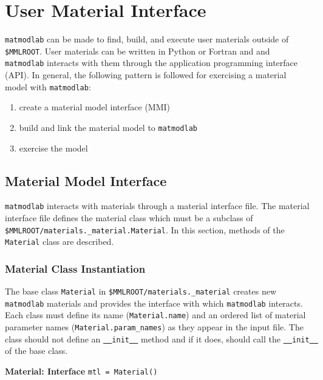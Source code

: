 \documentclass[12pt,report,strict]{SANDreport/SANDreport}
\newenvironment{interface}%
   {\par\noindent\adjustbox{margin=1ex,bgcolor=lemon,margin=0ex
       \medskipamount}\bgroup\minipage\textwidth}%
   {\endminipage\egroup}
\newcommand{\usage}[1]{\indent\hspace{2.5em}\texttt{#1}}
\newcommand{\mml}{\texttt{matmodlab}}
\newcommand{\us}{\underline{  }}
\newcommand{\uus}{\us\us{}}
\begin{document}
\chapter{User Material Interface}
\label{chap:usrmtl}
\mml{} can be made to find, build, and execute user materials outside of
\verb|$MMLROOT|.  User materials can be written in Python or Fortran and and
\mml{} interacts with them through the application programming interface
(API).  In general, the following pattern is followed for exercising a
material model with \mml{}:
%
\begin{enumerate}
  \item create a material model interface (MMI)
  \item build and link the material model to \mml{}
  \item exercise the model
\end{enumerate}
%

\section{Material Model Interface}
\label{sec:usrint}
\mml{} interacts with materials through a material interface file. The
material interface file defines the material class which must be a subclass of\\
\verb|$MMLROOT/materials._material.Material|.  In this section, methods of the
\verb|Material| class are described.

\subsection{Material Class Instantiation}
\label{sec:basecls}
The base class \verb|Material| in \verb|$MMLROOT/materials._material| creates
new \mml{} materials and provides the interface with which \mml{} interacts.
Each class must define its name (\verb|Material.name|) and an ordered list of
material parameter names (\verb|Material.param_names|) as they appear in the
input file.  The class should not define an \texttt{\uus{}init\uus{}} method
and if it does, should call the \texttt{\uus{}init\uus{}} of the base class.

\begin{interface}
  \textbf{Material: Interface}
\end{interface}
\usage{mtl = Material()}
\end{document}

